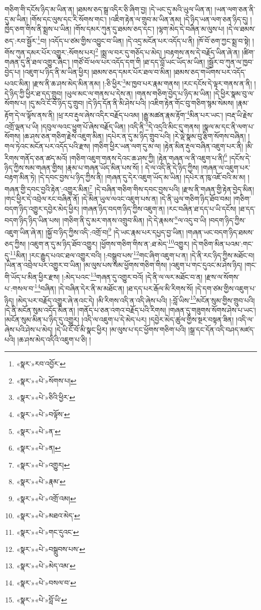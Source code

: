 གཅིག་གི་དངོས་ཉིད་མ་ཡིན་ན། །ཐམས་ཅད་སྒྲ་འདིར་ཅི་ཞིག་བྱ། །དེ་ཡང་དུ་མའི་ཡུལ་ཡིན་ན། །ཡན་ལག་ཅན་ནི་དུ་མ་ཡིན། །གོས་དང་ལུས་དང་རི་སོགས་གང་། །འཇིག་རྟེན་ལ་གྲུབ་མ་ཡིན་ནམ། །དེ་ཉིད་ཡན་ལག་ཅན་ཉིད་དུ། །ཁྱེད་ཅག་གིས་ནི་སྨྲས་པ་ཡིན། །གོས་དམར་ཀུན་དུ་ཐམས་ཅད་དང་། །ལྷག་མེད་དེ་བཞིན་མ་ལུས་པ། །དེ་ལ་ཐམས་ཅད་:རབ་སྦྱོར་\footnote{«སྣར་»རབ་འབྱོར་}བ། །འདོད་པ་ཙམ་གྱིས་འབྱུང་བ་ཡིན། །དེ་འདྲ་མངོན་པར་འདོད་པ་ནི། །ཁོ་བོ་ཅག་ཀྱང་སྨྲ་བ་སྟེ། །གོས་ཀུན་དམར་པོར་འགྱུར་:སོགས་པར།\footnote{«སྣར་»«པེ་»སོགས་པ།} །སྨྲ་ལ་བར་དུ་གཅོད་པ་མེད། །བརྟགས་ནས་དེ་བརྗོད་ཡིན་ཞེ་ན། །ཚིག་གཞན་དུ་ནི་ཐལ་འགྱུར་ཞིང་། །གཙོ་བོ་ཕལ་པར་འདོད་དག་གི །ཐ་དད་བློ་ཡང་ཡོད་མ་ཡིན། །སྦྱོར་བ་ཀུན་ལ་ཁྱབ་བྱེད་པ། །འཇུག་པ་ཉིད་ནི་མ་ཡིན་ཕྱིར། །ཐམས་ཅད་དམར་པོར་ཐལ་བ་མིན། །ཐམས་ཅད་གཡོགས་པར་འདོད་པའང་མིན། །རྫས་ནི་ཆ་ཤས་མེད་མིན་ནམ། །:ཅི་ཕྱིར་\footnote{«སྣར་»«པེ་»ཅིའི་ཕྱིར་}མ་ཁྱབ་པར་རྣམ་གནས། །རང་དངོས་དེ་ལྟར་གནས་ན་ནི། །དེ་ཉིད་ཀྱི་ཕྱིར་ཐ་དད་གྲུབ། །ཡུལ་མང་ལ་གནས་པ་དེས་ན། །གནས་གཅིག་བྱེད་པ་ཉིད་མ་ཡིན། །དེ་ཕྱིར་སྣམ་བུ་ལ་སོགས་པ། །དུ་མའི་ངོ་བོ་ཉིད་དུ་གྲུབ། །དེ་ཉིད་དོན་ནི་མི་ཤེས་པའི། །འཇིག་རྟེན་གོང་བུ་གཅིག་སྙམ་སེམས། །རྣམ་རྟོག་དེ་ལ་ལྟོས་ནས་ནི། །ཕྲ་རབ་རྡུལ་ཞེས་འདིར་བརྗོད་པའམ། །རྒྱུ་མཚན་རྣམ་རྟོག་\footnote{«སྣར་»«པེ་»བལྟོས་}མིན་པར་ཡང་། །བརྡ་ཡི་རྗེས་འགྲོ་ལྡན་པ་ཡི། །དབུལ་ལའང་ཕྱུག་པོ་ཞེས་བརྗོད་ཡིན། །འདི་ནི་\footnote{«སྣར་»«པེ་»ན་}དེ་འདྲའི་མིང་དུ་གནས། །སྣལ་མ་དང་ནི་ལག་པ་སོགས། །ཆ་ཤས་ཅན་གཅིག་རྗེས་འཇུག་མིན། །དཔེར་ན་དུ་མ་ཉིད་གྲུབ་པའི། །རེ་ལྡེ་སྣམ་བུ་རྩིག་སོགས་བཞིན། །གལ་ཏེའང་མངོན་པར་འདོད་པའི་རྫས། །གཅིག་ཕྱིར་ཡན་ལག་དུ་མ་ལ། །རྟེན་མིན་རྡུལ་བཞིན་འཇུག་པར་ནི། །མི་རིགས་གནོད་ཅན་ཚད་མའོ། །གཅིག་འཇུག་གནས་དེའང་ཆ་ཤས་ཀྱི། །རྟེན་གཞན་ལ་ནི་འཇུག་པ་ནི།\footnote{«སྣར་»«པེ་»ན།} །དངོས་དེ་ཉིད་ཀྱིས་སམ་གཞན་གྱིས། །རྣམ་པ་གཞན་ཡོད་མིན་པས་སོ། །
དེ་ལ་འདི་ནི་དེ་ཉིད་ཀྱིས། །གཞན་ལ་འཇུག་པར་བརྟག་མིན་ཏེ། །དེ་དབང་བྱས་པ་ཉིད་ཀྱིས་ནི། །གཞན་དུ་དེར་འཇུག་ཡོད་མ་ཡིན། །དཔེར་ན་ཁུ་འཇོ་བའི་མ་མ། །གཞན་གྱི་དབང་བྱའི་རྟེན་:འགྱུར་མིན།\footnote{«སྣར་»«པེ་»འགྱུར།} །དེ་བཞིན་གཅིག་གིས་དབང་བྱས་པའི། །རྫས་ནི་གཞན་གྱི་རྟེན་བྱེད་མིན། །གང་ཕྱིར་དེ་འབྲེལ་རང་བཞིན་ནོ། །དེ་མིན་ཡུལ་ལའང་འཇུག་པས་ན། །དེ་ནི་ཡུལ་གཅིག་ཉིད་ཐོབ་བམ། །གཅིག་བདག་ཉིད་འགྱུར་དབྱེར་མེད་ཕྱིར། །གཞན་ཉིད་བདག་ཉིད་ཀྱིས་འཇུག་ན། །རང་བཞིན་ཐ་དད་པ་ཡི་དངོས། །ཐ་དད་བདག་ཉིད་ཉིད་ཡིན་པས། །གཅིག་ནི་དུ་མར་གནས་འགྲུབ་མིན། །དེ་དེ་རྣམས་\footnote{«སྣར་»«པེ་»རྣམ་}ལ་འདུ་བ་ཡི། །བདག་ཉིད་ཀྱིས་འཇུག་ཡིན་ཞེ་ན། །སྐྱོ་བ་ཉིད་ཀྱིས་འདི་:འགྲོ་བ།\footnote{«སྣར་»«པེ་»འགྲོ་འམ།} །དེ་ཡང་རྣམ་པར་དཔྱད་བྱ་ཡིན། །གཞན་ཡང་བདག་ཉིད་ཐམས་ཅད་ཀྱིས། །འཇུག་ན་དུ་མ་ཉིད་ཐོབ་འགྱུར། །ཕྱོགས་གཅིག་གིས་ན་:ཐ་མེད་\footnote{«སྣར་»«པེ་»མཐའ་མེད་}འགྱུར། །དེ་གཅིག་མིན་པའམ་:གང་དུ་\footnote{«སྣར་»«པེ་»གང་དུའང་}མིན། །རང་རྒྱུད་པའང་ཐལ་འགྱུར་བའི། །:བསྒྲུབ་པས་\footnote{«སྣར་»«པེ་»བསྒྲུབས་པས་}གང་ཞིག་འཇུག་པ་ན། །དེ་ནི་རང་ཉིད་ཀྱིས་མཐོང་བ། །ཡིན་ན་འབྲེལ་པར་འགྱུར་བ་ཡིན། །མ་ལུས་པས་སམ་ཕྱོགས་གཅིག་གིས། །འཇུག་པ་གང་དུའང་མ་ཤེས་ཉིད། །གང་གི་ཡོད་པ་མིན་ཕྱིར་རྫས། །:མེད་པའང་\footnote{«སྣར་»«པེ་»མེད་འམ་}གཞན་དུ་འགྱུར་བའོ། །དེ་ནི་ལ་ལར་མཐོང་བ་ན། །རྫས་ལ་སོགས་པ་:གསལ་བ་\footnote{«སྣར་»«པེ་»བསལ་བ་}བཞིན། །དེ་བཞིན་དེར་ནི་མ་མཐོང་ན། །ཐ་དད་པར་རྒོལ་མི་རིགས་སོ། །དེ་དག་ཙམ་གྱིས་འཇུག་པ་ཉིད། །མེད་པར་བརྗོད་འགྱུར་ཞེ་ནའང་དེ། །མི་རིགས་འདི་ན་འདི་ཞེས་པའི། །:བློ་ཡིས་\footnote{«སྣར་»«པེ་»བློ་ཡི་}མངོན་སུམ་གྱིས་གྲུབ་པའི། །དེ་ནི་མངོན་སུམ་འདོད་མིན་ན། །གནོད་པ་ཅན་འགའ་བརྗོད་པའི་རིགས། །གཞན་དུ་གཟུགས་སོགས་ཤེས་པ་ཡང་། །མངོན་སུམ་མིན་པ་ཉིད་དུ་འགྱུར། །འདི་ལ་འཇུག་པ་དེ་མེད་པར། །དབྱེར་མེད་ཚུལ་གྱིས་སྔར་བསྟན་ཟིན། །འདི་ལ་ཞེས་པའི་ཤེས་པ་མེད། །དེ་ཡི་ངོ་བོ་མི་སྣང་ཕྱིར། །མ་ལུས་པ་དང་ཕྱོགས་གཅིག་པའི། །སྒྲ་དང་དོན་འདི་བཤད་མཛད་པའི། །ཆ་ཤས་མེད་འདིའི་འཇུག་པ་ཅི། །
